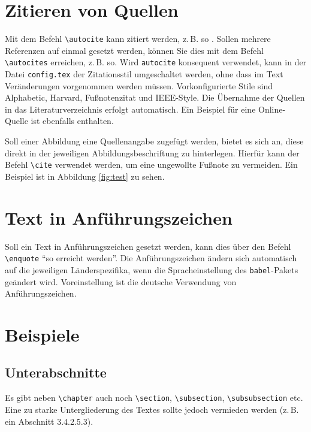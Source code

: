 \section{Zitieren von Quellen}
Mit dem Befehl \texttt{\textbackslash autocite} kann zitiert werden, z.\,B. so \autocite[Vgl.][S. 18ff.]{ME12}. Sollen mehrere Referenzen auf einmal gesetzt werden, können Sie dies mit dem Befehl \texttt{\textbackslash autocites} erreichen, z.\,B. so\autocites[Vgl.][S. 10]{ME12}[][S. 100]{TD15}. Wird \texttt{autocite} konsequent verwendet, kann in der Datei \texttt{config.tex} der Zitationsstil umgeschaltet werden, ohne dass im Text Veränderungen vorgenommen werden müssen. Vorkonfigurierte Stile sind Alphabetic, Harvard, Fußnotenzitat und IEEE-Style. Die Übernahme der Quellen in das Literaturverzeichnis erfolgt automatisch. Ein Beispiel für eine Online-Quelle ist ebenfalls enthalten.\autocite[Vgl.][]{TestOnlineQuelle}

Soll einer Abbildung eine Quellenangabe zugefügt werden, bietet es sich an, diese direkt in der jeweiligen Abbildungsbeschriftung zu hinterlegen. Hierfür kann der Befehl \texttt{\textbackslash cite} verwendet werden, um eine ungewollte Fußnote zu vermeiden. Ein Beispiel ist in Abbildung 
\vref{fig:test} zu sehen. 


\section{Text in Anführungszeichen}
Soll ein Text in Anführungszeichen gesetzt werden, kann dies über den Befehl \texttt{\textbackslash enquote} \enquote{so erreicht werden}. Die Anführungszeichen ändern sich automatisch auf die 
jeweiligen Länderspezifika, wenn die Spracheinstellung des \texttt{babel}-Pakets geändert wird. Voreinstellung ist die deutsche Verwendung von 
Anführungszeichen.




\section{Beispiele}
\lipsum[1]

\subsection{Unterabschnitte}
Es gibt neben \texttt{\textbackslash chapter} auch noch  \texttt{\textbackslash section}, \texttt{\textbackslash subsection}, \texttt{\textbackslash subsubsection} etc. Eine zu starke Untergliederung des Textes sollte jedoch vermieden werden (z.\,B. ein Abschnitt 3.4.2.5.3). 

